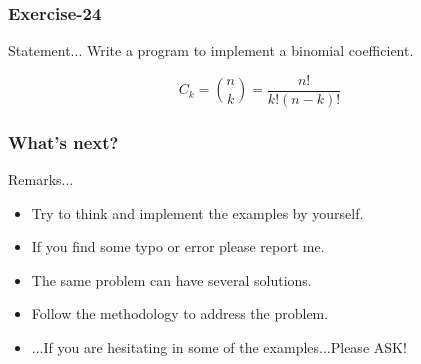 \documentclass[xcolor=dvipsnames,dvip,notes=show,table]{beamer}
\begin{document}
\begin{frame}[fragile]
\frametitle{Exercise-24}
\begin{block}{Statement...}
Write a program to implement a binomial coefficient.
\end{block}
% 

\begin{equation}
C_{k} = \binom{n}{k} = \frac{n!}{k!(n-k)!} 
\end{equation}

\end{frame}


\begin{frame}[fragile]
\frametitle{What's next?}
\begin{exampleblock}{Remarks...}
\begin{itemize}
 \item Try to think and implement the examples by yourself.
 \item If you find some typo or error please report me.
 \item The same problem can have several solutions.
 \item Follow the methodology to address the problem.
 \item ...If you are hesitating in some of the examples...Please ASK!
\end{itemize}

\end{exampleblock}



\end{frame}


\frame{
\titlepage

}


\end{document}
